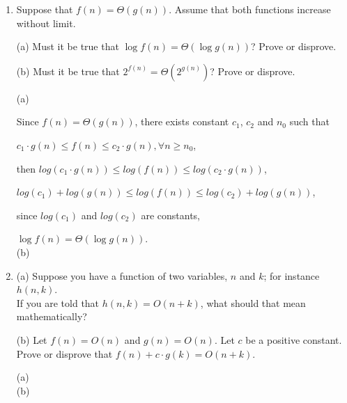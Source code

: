 \documentclass[12pt]{article}
\begin{document}
  
\pagestyle{empty}
 




\vskip 0.5in


\begin{enumerate}

\item 
Suppose that $f(n) = \Theta(g(n))$. Assume that both functions increase without limit.

(a) Must it be true that $\log f(n) = \Theta(\log g(n))$? Prove or disprove.

(b)  Must it be  true that $2^{f(n)} = \Theta(2^{g(n)})$? Prove or disprove.\\


{\color{blue}{\bf Answer:\\}}

(a) 

Since $f(n) = \Theta(g(n))$, there exists constant $c_1$, $c_2$ and $n_0$ such that 

 $c_1\cdot g(n) \le f(n) \le c_2\cdot g(n),  \forall n \geq n_0$,

 then $log(c_1\cdot g(n)) \le log(f(n)) \le log(c_2\cdot g(n))$,

 $log(c_1) + log(g(n)) \le log(f(n)) \le log(c_2) + log(g(n))$,

 since $log(c_1)$ and $log(c_2)$ are constants,
 
$\log f(n) = \Theta(\log g(n))$.\\


(b) 





\newpage

\item
(a) Suppose you have a function of two variables, $n$ and $k$; for instance $h(n,k)$. \\ If you are told  that $h(n,k) = O(n+k)$, what should that mean mathematically? 

(b) 
 Let $f(n) = O(n)$ and $g(n) = O(n)$.  Let $c$ be a positive constant. \\   
Prove or disprove that  $f(n) + c\cdot g(k) = O(n+k)$. \\


{\color{blue}{\bf Answer:\\}}


(a) \\

(b) 







\end{enumerate}
\end{document}
